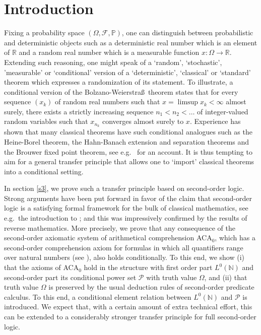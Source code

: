 \documentclass{jloganal}
\numberwithin{equation}{section}
\theoremstyle{plain}
\newcommand\N{\mathbb{N}}
\begin{document}
\maketitle



\section{Introduction}

Fixing a probability space $(\Omega,\mathcal{F},\mathbb{P})$, one can distinguish between probabilistic and deterministic objects such as a deterministic real number which is an element of $\mathbb{R}$ and a random real number which is a measurable function $x\colon \Omega \to \mathbb{R}$. 
Extending such reasoning, one might speak of a `random', `stochastic', 'measurable' or `conditional' version of a `deterministic', `classical' or `standard' theorem which expresses a randomization of its statement.  
 To illustrate, a conditional version of the Bolzano-Weierstra\ss~theorem states that for every sequence $(x_k)$ of random real numbers such that $x=\limsup x_k<\infty$ almost surely, there exists a strictly increasing sequence $n_1<n_2<\ldots$ of integer-valued random variables such that $x_{n_k}$ converges almost surely to $x$.  
Experience has shown that many classical theorems have such conditional analogues such as the Heine-Borel theorem, the Hahn-Banach extension and separation theorems and the Brouwer fixed point theorem, see e.g.~\cite{cheridito2015conditional,drapeau2016algebra,drapeau2013brouwer,filipovic2009separation,jamneshan2017measures,jamneshan2017compact} for an account. It is thus tempting to aim for a general transfer principle that allows one to `import' classical theorems into a conditional setting. 

In section \ref{s3}, we prove such a transfer principle
based on second-order logic. Strong arguments have been put forward in favor of the claim that second-order logic is a satisfying formal framework for the bulk
of classical mathematics, see e.g.~the introduction to \cite{simpson2009subsystems}; and this was impressively confirmed by the results of reverse mathematics. 
More precisely, we prove that any consequence of the second-order axiomatic system of arithmetical comprehension ACA$_{0}$, which has a second-order comprehension axiom for formulas in which all quantifiers range
over natural numbers (see \cite{simpson2009subsystems}), also holds conditionally. 
To this end, we show (i) that the axioms of ACA$_{0}$ hold in the structure with first order part $L^{0}(\mathbb{N})$ and second-order part its conditional power set $\mathcal{P}$ with truth value $\Omega$, and 
(ii) that truth value $\Omega$ is preserved by the usual deduction rules of second-order predicate calculus. 
To this end, a conditional element relation between $L^0(\N)$ and $\mathcal{P}$ is introduced.  
We expect that, with a certain amount of extra technical effort,
this can be extended to a considerably stronger transfer principle for full second-order logic.
\end{document}
